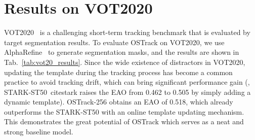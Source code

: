 \section{Results on VOT2020}
VOT2020~\cite{vot2020} is a challenging short-term tracking benchmark that is evaluated by target segmentation results. To evaluate OSTrack on VOT2020, we use AlphaRefine~\cite{alpha_refine} to generate segmentation masks, and the results are shown in Tab.~\ref{tab:vot20_results}. Since the wide existence of distractors in VOT2020, updating the template during the tracking process has become a common practice to avoid tracking drift, which can bring significant performance gain (\eg, STARK-ST50~cite{stark} raises the EAO from 0.462 to 0.505 by simply adding a dynamic template).  
OSTrack-256 obtains an EAO of 0.518, which already outperforms the STARK-ST50 with an online template updating mechanism. This demonstrates the great potential of OSTrack which serves as a neat and strong baseline model. 

